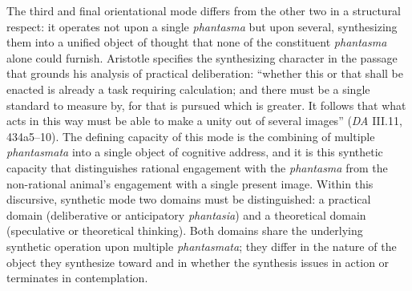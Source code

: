 \documentclass{article}
\begin{document}
The third and final orientational mode differs from the other two in a structural respect: it operates not upon a single \textit{phantasma} but upon several, synthesizing them into a unified object of thought that none of the constituent \textit{phantasma} alone could furnish. Aristotle specifies the synthesizing character in the passage that grounds his analysis of practical deliberation: ``whether this or that shall be enacted is already a task requiring calculation; and there must be a single standard to measure by, for that is pursued which is greater. It follows that what acts in this way must be able to make a unity out of several images'' (\textit{DA} III.11, 434a5--10). The defining capacity of this mode is the combining of multiple \textit{phantasmata} into a single object of cognitive address, and it is this synthetic capacity that distinguishes rational engagement with the \textit{phantasma} from the non-rational animal's engagement with a single present image. Within this discursive, synthetic mode two domains must be distinguished: a practical domain (deliberative or anticipatory \textit{phantasia}) and a theoretical domain (speculative or theoretical thinking). Both domains share the underlying synthetic operation upon multiple \textit{phantasmata}; they differ in the nature of the object they synthesize toward and in whether the synthesis issues in action or terminates in contemplation. 
\end{document}
